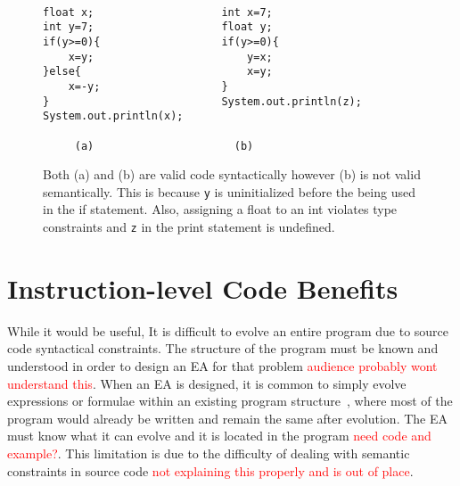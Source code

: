 \documentclass{sig-alternate}
\newcommand{\mycomment}[1]{\textcolor{red}{#1}}
\begin{document}
\begin{figure}
\centering
{\tt
\begin{verbatim}
float x;                    int x=7;
int y=7;                    float y;
if(y>=0){                   if(y>=0){
    x=y;                        y=x;
}else{                          x=y;
    x=-y;                   }
}                           System.out.println(z);
System.out.println(x);	
     
     (a)                      (b)

\end{verbatim}
}
\caption{Both (a) and (b) are valid code syntactically however (b) is not valid semantically. This is because \texttt{y} is uninitialized before the being used in the if statement. Also, assigning a float to an int violates type constraints and \texttt{z} in the print statement is undefined.}
\label{semantics}
\end{figure}



\section{Instruction-level Code Benefits}

While it would be useful, It is difficult to evolve an entire program due to source code syntactical constraints. The structure of the program must be known and understood in order to design an EA for that problem \mycomment{audience probably wont understand this}. When an EA is designed, it is common to simply evolve expressions or formulae within an existing program structure~\cite{FINCH:2011}, where most of the program would already be written and remain the same after evolution. The EA must know what it can evolve and it is located in the program \mycomment{need code and example?}. This limitation is due to the difficulty of dealing with semantic constraints in source code \mycomment{not explaining this properly and is out of place}.
\end{document}
